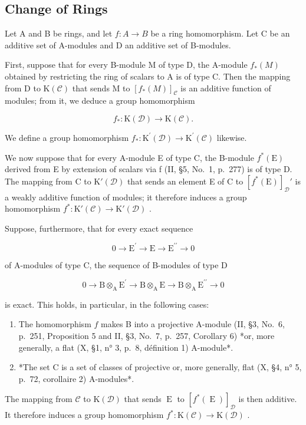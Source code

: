 \subsection{Change of Rings}

Let A and B be rings, and let \(f : A \to B\) be a ring homomorphism. Let C be an additive set of A-modules and D an additive set of B-modules.

First, suppose that for every B-module M of type D, the A-module \(f_{*}(M)\) obtained by restricting the ring of scalars to A is of type C. Then the mapping from D to \(\mathrm{K}(\mathcal{C})\) that sends M to \([f_{*}(M)]_{\mathcal{C}}\) is an additive function of modules; from it, we deduce a group homomorphism

\[
f _ {*}: \mathrm{K} (\mathcal {D}) \longrightarrow \mathrm{K} (\mathcal {C}).
\]

We define a group homomorphism \(f_{*}:\mathrm{K}^{\prime}(\mathcal{D})\to \mathrm{K}^{\prime}(\mathcal{C})\) likewise.

We now suppose that for every A-module E of type C, the B-module \(f^{*}(\mathrm{E})\) derived from E by extension of scalars via f (II, §5, No.~1, p.~277) is of type D. The mapping from C to \(\mathrm{K}'(\mathcal{D})\) that sends an element E of C to \([f^{*}(\mathrm{E})]_{\mathcal{D}}'\) is a weakly additive function of modules; it therefore induces a group homomorphism \(f^{*}: \mathrm{K}'(\mathcal{C}) \to \mathrm{K}'(\mathcal{D})\) .

Suppose, furthermore, that for every exact sequence

\[
0 \longrightarrow \mathrm{E} ^ {\prime} \longrightarrow \mathrm{E} \longrightarrow \mathrm{E} ^ {\prime \prime} \longrightarrow 0
\]

of A-modules of type C, the sequence of B-modules of type D

\[
0 \longrightarrow \mathrm{B} \otimes_ {\mathrm{A}} \mathrm{E} ^ {\prime} \longrightarrow \mathrm{B} \otimes_ {\mathrm{A}} \mathrm{E} \longrightarrow \mathrm{B} \otimes_ {\mathrm{A}} \mathrm{E} ^ {\prime \prime} \longrightarrow 0
\]

is exact. This holds, in particular, in the following cases:

\begin{enumerate}
\def\labelenumi{\alph{enumi})}
\item
  The homomorphism \(f\) makes B into a projective A-module (II, §3, No.~6, p.~251, Proposition 5 and II, §3, No.~7, p.~257, Corollary 6) *or, more generally, a flat (X, §1, n° 3, p.~8, définition 1) A-module*.
\item
  *The set C is a set of classes of projective or, more generally, flat (X, §4, n° 5, p.~72, corollaire 2) A-modules*.
\end{enumerate}

The mapping from \(\mathcal{C}\) to \(\mathrm{K}(\mathcal{D})\) that sends \(\operatorname{E}\) to \([f^{*}(\operatorname{E})]_{\mathcal{D}}\) is then additive. It therefore induces a group homomorphism \(f^{*}:\mathrm{K}(\mathcal{C})\to \mathrm{K}(\mathcal{D})\) .
\relax{}
